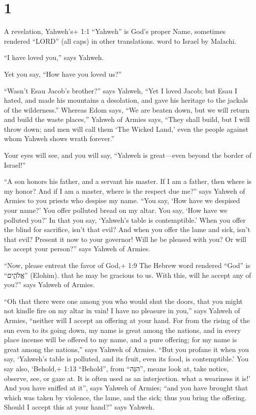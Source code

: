 \hypertarget{section}{%
\section{1}\label{section}}

 A revelation, Yahweh's+ 1:1 ``Yahweh'' is God's proper
Name, sometimes rendered ``LORD'' (all caps) in other translations. word
to Israel by Malachi.

 ``I have loved you,'' says Yahweh.

Yet you say, ``How have you loved us?''

``Wasn't Esau Jacob's brother?'' says Yahweh, ``Yet I loved Jacob;
 but Esau I hated, and made his mountains a desolation, and
gave his heritage to the jackals of the wilderness.'' 
Whereas Edom says, ``We are beaten down, but we will return and build
the waste places,'' Yahweh of Armies says, ``They shall build, but I
will throw down; and men will call them `The Wicked Land,' even the
people against whom Yahweh shows wrath forever.''

 Your eyes will see, and you will say, ``Yahweh is
great---even beyond the border of Israel!''

 ``A son honors his father, and a servant his master. If I
am a father, then where is my honor? And if I am a master, where is the
respect due me?'' says Yahweh of Armies to you priests who despise my
name. ``You say, `How have we despised your name?'  You
offer polluted bread on my altar. You say, `How have we polluted you?'
In that you say, `Yahweh's table is contemptible.'  When you
offer the blind for sacrifice, isn't that evil? And when you offer the
lame and sick, isn't that evil? Present it now to your governor! Will he
be pleased with you? Or will he accept your person?'' says Yahweh of
Armies.

 ``Now, please entreat the favor of God,+ 1:9 The Hebrew
word rendered ``God'' is ``אֱלֹהִ֑ים'' (Elohim). that he may be gracious
to us. With this, will he accept any of you?'' says Yahweh of Armies.

 ``Oh that there were one among you who would shut the
doors, that you might not kindle fire on my altar in vain! I have no
pleasure in you,'' says Yahweh of Armies, ``neither will I accept an
offering at your hand.  For from the rising of the sun even
to its going down, my name is great among the nations, and in every
place incense will be offered to my name, and a pure offering; for my
name is great among the nations,'' says Yahweh of Armies. 
``But you profane it when you say, `Yahweh's table is polluted, and its
fruit, even its food, is contemptible.'  You say also,
`Behold,+ 1:13 ``Behold'', from ``הִנֵּה'', means look at, take notice,
observe, see, or gaze at. It is often used as an interjection. what a
weariness it is!' And you have sniffed at it'', says Yahweh of Armies;
``and you have brought that which was taken by violence, the lame, and
the sick; thus you bring the offering. Should I accept this at your
hand?'' says Yahweh.

